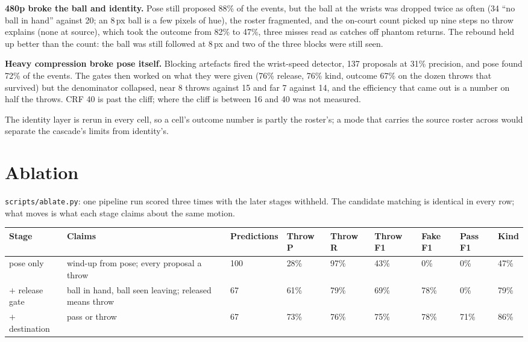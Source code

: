 \documentclass[10pt,a4paper]{article}
\begin{document}
\textbf{480p broke the ball and identity.} Pose still proposed 88\% of the events, but the
ball at the wrists was dropped twice as often (34 ``no ball in hand'' against 20; an 8\,px
ball is a few pixels of hue), the roster fragmented, and the on-court count picked up nine
steps no throw explains (none at source), which took the outcome from 82\% to 47\%, three
misses read as catches off phantom returns. The rebound held up better than the count: the
ball was still followed at 8\,px and two of the three blocks were still seen.

\textbf{Heavy compression broke pose itself.} Blocking artefacts fired the wrist-speed
detector, 137 proposals at 31\% precision, and pose found 72\% of the events.
The gates then worked on what they were given (76\% release, 76\% kind, outcome 67\% on
the dozen throws that survived) but the denominator collapsed, near 8 throws against 15
and far 7 against 14, and the efficiency that came out is a number on half the throws.
CRF 40 is past the cliff; where the cliff is between 16 and 40 was not measured.

The identity layer is rerun in every cell, so a cell's outcome number is partly the
roster's; a mode that carries the source roster across would separate the cascade's limits
from identity's.

\section{Ablation}
\label{sec:ablation}

\texttt{scripts/ablate.py}: one pipeline run scored three times with the later stages
withheld. The candidate matching is identical in every row; what moves is what each stage
claims about the same motion.

{\footnotesize
\begin{xltabular}{\textwidth}{L{20mm} L{36mm} R{16mm} R{9mm} R{9mm} R{9mm} R{9mm} R{9mm} R{9mm}}
\toprule
\textbf{Stage} & \textbf{Claims} & \textbf{Predictions} & \textbf{Throw P} & \textbf{Throw R} & \textbf{Throw F1} & \textbf{Fake F1} & \textbf{Pass F1} & \textbf{Kind}\\
\midrule
pose only & wind-up from pose; every proposal a throw & 100 & 28\% & 97\% & 43\% & 0\% & 0\% & 47\%\\
$+$ release gate & ball in hand, ball seen leaving; released means throw & 67 & 61\% & 79\% & 69\% & 78\% & 0\% & 79\%\\
$+$ destination & pass or throw & 67 & 73\% & 76\% & 75\% & 78\% & 71\% & 86\%\\
\bottomrule
\end{xltabular}}
\end{document}
